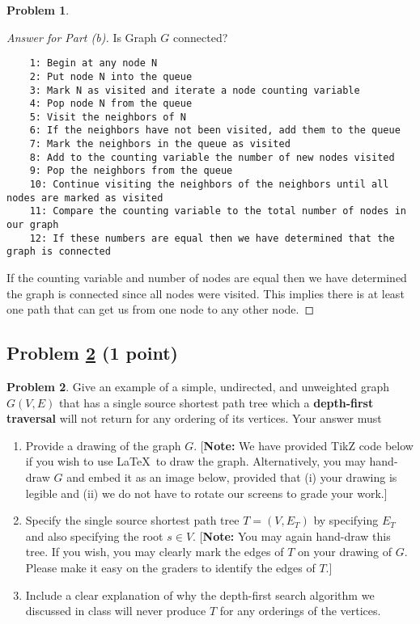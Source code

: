 \documentclass[11pt]{article}
\theoremstyle{definition}
\theoremstyle{definition}
\newtheorem{required}{Problem}
\theoremstyle{definition}
\begin{document}
\begin{required}
\begin{enumerate}[label=(\alph*)]
\begin{proof}[Answer for Part (b)]
Is Graph $G$ connected?
\begin{verbatim}
	1: Begin at any node N
	2: Put node N into the queue
	3: Mark N as visited and iterate a node counting variable
	4: Pop node N from the queue
	5: Visit the neighbors of N
	6: If the neighbors have not been visited, add them to the queue
	7: Mark the neighbors in the queue as visited
	8: Add to the counting variable the number of new nodes visited
	9: Pop the neighbors from the queue
	10: Continue visiting the neighbors of the neighbors until all nodes are marked as visited
	11: Compare the counting variable to the total number of nodes in our graph
	12: If these numbers are equal then we have determined that the graph is connected
\end{verbatim}
If the counting variable and number of nodes are equal then we have determined the graph is connected since all nodes were visited. This implies there is at least one path that can get us from one node to any other node.
\end{proof}
\end{enumerate}
\end{required}






\newpage
\subsection{Problem \ref{DFS2} (1 point)} 
\begin{required} \label{DFS2}
Give an example of a simple, undirected, and unweighted graph $G(V, E)$ that has a single source shortest path tree which a \textbf{depth-first traversal} will not return for any ordering of its vertices. 
    Your answer must
    \begin{enumerate}[label=(\alph*)]
    	\item Provide a drawing of the graph $G$. [\textbf{Note:} We have provided TikZ code below if you wish to use \LaTeX \ to draw the graph. Alternatively, you may hand-draw $G$ and embed it as an image below, provided that (i) your drawing is legible and (ii) we do not have to rotate our screens to grade your work.]
    	\item Specify the single source shortest path tree $T = (V,E_T)$ by specifying $E_T$ and also specifying the root $s \in V$. [\textbf{Note:} You may again hand-draw this tree. If you wish, you may clearly mark the edges of $T$ on your drawing of $G$. Please make it easy on the graders to identify the edges of $T$.] 
    	\item Include a clear explanation of why the depth-first search algorithm we discussed in class will never produce $T$ for any orderings of the vertices.
    \end{enumerate}

\end{required}
\end{document}
